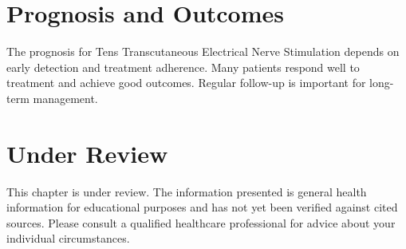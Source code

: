 \section*{Prognosis and Outcomes}
The prognosis for Tens Transcutaneous Electrical Nerve Stimulation depends on early detection and treatment adherence. Many patients respond well to treatment and achieve good outcomes. Regular follow-up is important for long-term management.
\section*{Under Review}
This chapter is under review. The information presented is general health information for educational purposes and has not yet been verified against cited sources. Please consult a qualified healthcare professional for advice about your individual circumstances.


\clearpage
